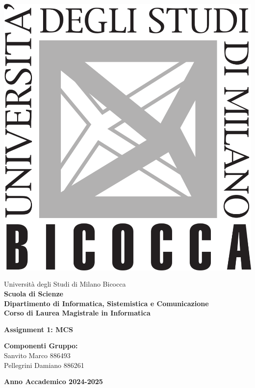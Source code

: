 \setlength\intextsep{0pt}

\noindent
\begin{minipage}{0.2\textwidth}
  \includegraphics[width=5\baselineskip]{images/bicocca_logo.png}
\end{minipage}%
\begin{minipage}{0.8\textwidth}
  Università degli Studi di Milano Bicocca \\[8pt]
  \textbf{Scuola di Scienze} \\[8pt]
  \textbf{Dipartimento di Informatica, Sistemistica e Comunicazione}\\[8pt]
  \textbf{Corso di Laurea Magistrale in Informatica}
\end{minipage}

\vspace{30mm}

\begin{center}
    \Huge
    \textbf{Assignment 1: MCS}
\end{center}

\vspace{60mm}

\large
\noindent
\textbf{Componenti Gruppo:} \\[7pt]
Sanvito Marco 886493 \\[7pt]
Pellegrini Damiano 886261 \\[20pt]

\vspace{35mm}


\begin{center}
\textbf{Anno Accademico 2024-2025}
\end{center}
\newpage
